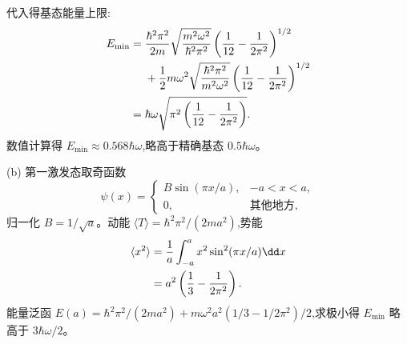 \begin{question}
\begin{solution}
代入得基态能量上限:
\[
\begin{aligned}E_{\min}={}&{\hbar^2\pi^2\over2m}\sqrt{m^2\omega^2\over\hbar^2\pi^2}\left({1\over12}-{1\over2\pi^2}\right)^{1/2}\\&+{1\over2}m\omega^2\sqrt{\hbar^2\pi^2\over m^2\omega^2}\left({1\over12}-{1\over2\pi^2}\right)^{1/2}\\={}&\hbar\omega\sqrt{\pi^2\left({1\over12}-{1\over2\pi^2}\right)}.\end{aligned}
\]
数值计算得 $E_{\min}\approx0.568\hbar\omega$,略高于精确基态 $0.5\hbar\omega$。

(b) 第一激发态取奇函数
\[
\psi(x)=\begin{cases}
B\sin(\pi x/a), & -a<x<a,\\
0, & \text{其他地方},
\end{cases}
\]
归一化 $B=1/\sqrt{a}$。动能 $\langle T\rangle=\hbar^2\pi^2/(2ma^2)$,势能
\[
\begin{aligned}\langle x^2\rangle&={1\over a}\int_{-a}^a x^2\sin^2(\pi x/a)\dd x\\&=a^2\left({1\over3}-{1\over2\pi^2}\right).\end{aligned}
\]
能量泛函 $E(a)=\hbar^2\pi^2/(2ma^2)+m\omega^2a^2(1/3-1/2\pi^2)/2$,求极小得 $E_{\min}$ 略高于 $3\hbar\omega/2$。
\end{solution}
\end{question}

